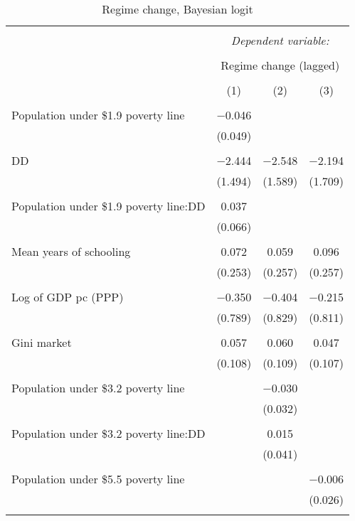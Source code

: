 \documentclass[a4paper, 12pt]{article}
\begin{document}
		\begin{table}
\caption{Regime change, Bayesian logit}
\label{bayesglmrc}
\centering
\begin{tabular}[t]{lccc}
\\[-1.8ex]\hline 
\hline \\[-1.8ex] 
 & \multicolumn{3}{c}{\textit{Dependent variable:}} \\ 
\cline{2-4} 
\\[-1.8ex] & \multicolumn{3}{c}{Regime change (lagged)} \\ 
\\[-1.8ex] & (1) & (2) & (3)\\ 
\hline \\[-1.8ex] 
Population under \$1.9 poverty line & $-$0.046 &  & \\
 & (0.049) &  & \\
 & & & \\ 
DD & $-$2.444 & $-$2.548 & $-$2.194\\
 & (1.494) & (1.589) & (1.709)\\
 & & & \\ 
Population under \$1.9 poverty line:DD & 0.037 &  & \\
 & (0.066) &  & \\
 & & & \\ 
Mean years of schooling & 0.072 & 0.059 & 0.096\\
 & (0.253) & (0.257) & (0.257)\\
 & & & \\ 
Log of GDP pc (PPP) & $-$0.350 & $-$0.404 & $-$0.215\\
 & (0.789) & (0.829) & (0.811)\\
 & & & \\ 
Gini market & 0.057 & 0.060 & 0.047\\
 & (0.108) & (0.109) & (0.107)\\
 & & & \\ 
Population under \$3.2 poverty line &  & $-$0.030 & \\
 &  & (0.032) & \\
 & & & \\ 
Population under \$3.2 poverty line:DD &  & 0.015 & \\
 &  & (0.041) & \\
 & & & \\ 
Population under \$5.5 poverty line &  &  & $-$0.006\\
 &  &  & \vphantom{1} (0.026)\\
 & & & \\ 

\end{tabular}
\end{table}
\end{document}
